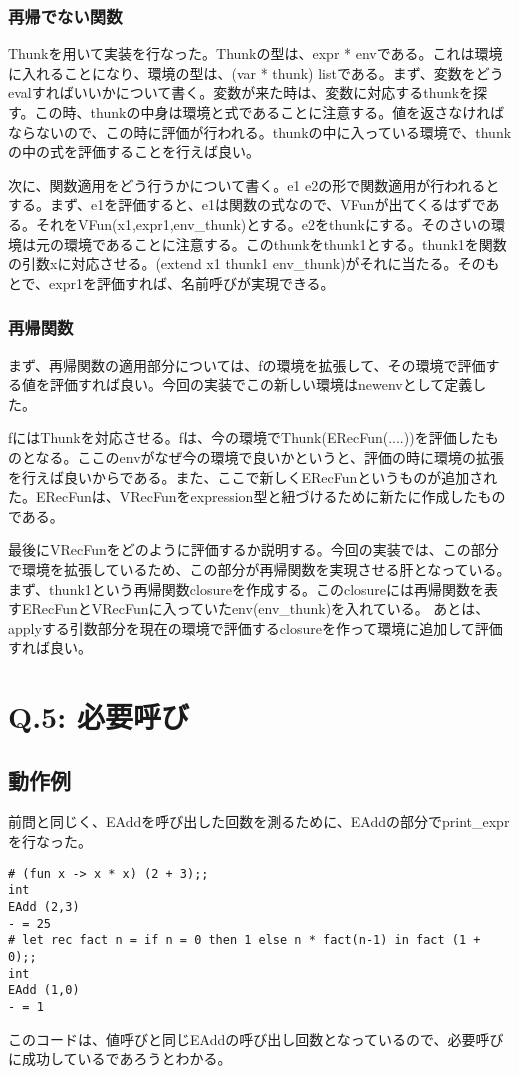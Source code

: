\documentclass[uplatex,12pt]{jsarticle}
\begin{document}
\subsubsection{再帰でない関数}
Thunkを用いて実装を行なった。Thunkの型は、expr * envである。これは環境に入れることになり、環境の型は、(var * thunk) listである。まず、変数をどうevalすればいいかについて書く。変数が来た時は、変数に対応するthunkを探す。この時、thunkの中身は環境と式であることに注意する。値を返さなければならないので、この時に評価が行われる。thunkの中に入っている環境で、thunkの中の式を評価することを行えば良い。

次に、関数適用をどう行うかについて書く。e1 e2の形で関数適用が行われるとする。まず、e1を評価すると、e1は関数の式なので、VFunが出てくるはずである。それをVFun(x1,expr1,env\_thunk)とする。e2をthunkにする。そのさいの環境は元の環境であることに注意する。このthunkをthunk1とする。thunk1を関数の引数xに対応させる。(extend x1 thunk1 env\_thunk)がそれに当たる。そのもとで、expr1を評価すれば、名前呼びが実現できる。

\subsubsection{再帰関数}
まず、再帰関数の適用部分については、fの環境を拡張して、その環境で評価する値を評価すれば良い。今回の実装でこの新しい環境はnewenvとして定義した。

fにはThunkを対応させる。fは、今の環境でThunk(ERecFun(....))を評価したものとなる。ここのenvがなぜ今の環境で良いかというと、評価の時に環境の拡張を行えば良いからである。また、ここで新しくERecFunというものが追加された。ERecFunは、VRecFunをexpression型と紐づけるために新たに作成したものである。

最後にVRecFunをどのように評価するか説明する。今回の実装では、この部分で環境を拡張しているため、この部分が再帰関数を実現させる肝となっている。まず、thunk1という再帰関数closureを作成する。このclosureには再帰関数を表すERecFunとVRecFunに入っていたenv(env\_thunk)を入れている。
あとは、applyする引数部分を現在の環境で評価するclosureを作って環境に追加して評価すれば良い。

\section{Q.5: 必要呼び}
\subsection{動作例}
前問と同じく、EAddを呼び出した回数を測るために、EAddの部分でprint\_exprを行なった。
\begin{lstlisting}[caption=動作例]
# (fun x -> x * x) (2 + 3);;
int
EAdd (2,3)
- = 25
# let rec fact n = if n = 0 then 1 else n * fact(n-1) in fact (1 + 0);;
int
EAdd (1,0)
- = 1
\end{lstlisting}
このコードは、値呼びと同じEAddの呼び出し回数となっているので、必要呼びに成功しているであろうとわかる。
\end{document}
